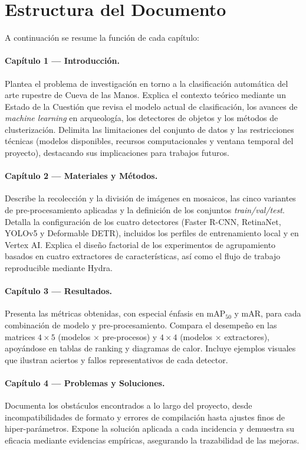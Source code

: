\section{Estructura del Documento}\label{sec:estructura_documento}

A continuación se resume la función de cada capítulo:

\paragraph{Capítulo 1 — Introducción.}
Plantea el problema de investigación en torno a la clasificación automática del arte rupestre de Cueva de las Manos.
Explica el contexto teórico mediante un Estado de la Cuestión que revisa el modelo actual de clasificación, los avances de \textit{machine learning} en arqueología, los detectores de objetos y los métodos de clusterización.
Delimita las limitaciones del conjunto de datos y las restricciones técnicas (modelos disponibles, recursos computacionales y ventana temporal del proyecto), destacando sus implicaciones para trabajos futuros.

\paragraph{Capítulo 2 — Materiales y Métodos.}
Describe la recolección y la división de imágenes en mosaicos, las cinco variantes de pre-procesamiento aplicadas y la definición de los conjuntos \textit{train/val/test}.
Detalla la configuración de los cuatro detectores (Faster R-CNN, RetinaNet, YOLOv5 y Deformable DETR), incluidos los perfiles de entrenamiento local y en Vertex AI.
Explica el diseño factorial de los experimentos de agrupamiento basados en cuatro extractores de características, así como el flujo de trabajo reproducible mediante Hydra.

\paragraph{Capítulo 3 — Resultados.}
Presenta las métricas obtenidas, con especial énfasis en \(\mathrm{mAP}_{50}\) y \(\mathrm{mAR}\), para cada combinación de modelo y pre-procesamiento.
Compara el desempeño en las matrices \(4\times5\) (modelos × pre-procesos) y \(4\times4\) (modelos × extractores), apoyándose en tablas de ranking y diagramas de calor.
Incluye ejemplos visuales que ilustran aciertos y fallos representativos de cada detector.

\paragraph{Capítulo 4 — Problemas y Soluciones.}
Documenta los obstáculos encontrados a lo largo del proyecto, desde incompatibilidades de formato y errores de compilación hasta ajustes finos de hiper-parámetros.
Expone la solución aplicada a cada incidencia y demuestra su eficacia mediante evidencias empíricas, asegurando la trazabilidad de las mejoras.

